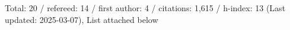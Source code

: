Total: 20 / refereed: 14 / first author: 4 / citations: 1,615 / h-index: 13 (Last updated: 2025-03-07), List attached below